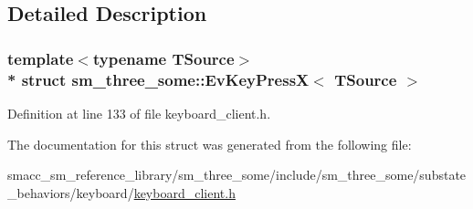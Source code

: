 \subsection{Detailed Description}
\subsubsection*{template$<$typename T\+Source$>$\\*
struct sm\+\_\+three\+\_\+some\+::\+Ev\+Key\+Press\+X$<$ T\+Source $>$}



Definition at line 133 of file keyboard\+\_\+client.\+h.



The documentation for this struct was generated from the following file\+:\begin{DoxyCompactItemize}
\item 
smacc\+\_\+sm\+\_\+reference\+\_\+library/sm\+\_\+three\+\_\+some/include/sm\+\_\+three\+\_\+some/substate\+\_\+behaviors/keyboard/\hyperlink{keyboard__client_8h}{keyboard\+\_\+client.\+h}\end{DoxyCompactItemize}
